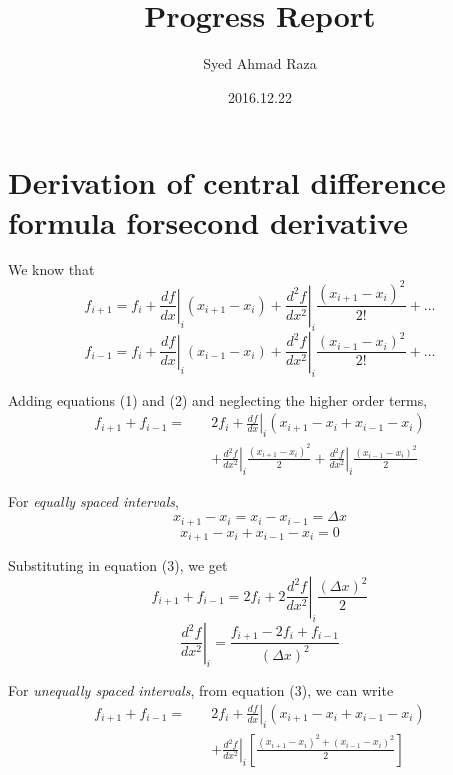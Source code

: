 \documentclass[12pt,a4paper,fleqn]{article}
\title{Progress Report}
\author{Syed Ahmad Raza}
\date{2016.12.22}
\begin{document}
\maketitle
\section*{Derivation of central difference formula for\newline second
derivative}

We know that
\begin{equation}
f_{i+1} = f_i + \left.\frac{df}{dx}\right|_i(x_{i+1} - x_i) +
\left.\frac{d^2f}{dx^2}\right|_i\frac{(x_{i+1} - x_i)^2}{2!} + \ldots
\end{equation}
\begin{equation}
f_{i-1} = f_i + \left.\frac{df}{dx}\right|_i(x_{i-1} - x_i) +
\left.\frac{d^2f}{dx^2}\right|_i\frac{(x_{i-1} - x_i)^2}{2!} + \ldots
\end{equation}

Adding equations (1) and (2) and neglecting the higher order terms,
\begin{equation}
\begin{split}
f_{i+1} + f_{i-1} = \quad &2f_i + \left.\frac{df}{dx}\right|_i(x_{i+1} - x_i +
x_{i-1} - x_i)
\\& + \left.\frac{d^2f}{dx^2}\right|_i\frac{(x_{i+1} - x_i)^2}{2} +
\left.\frac{d^2f}{dx^2}\right|_i\frac{(x_{i-1} - x_i)^2}{2}
\end{split}
\end{equation}

For \emph{equally spaced intervals},
\begin{equation*}
x_{i+1} - x_i = x_i - x_{i-1} = \Delta x
\end{equation*}
\begin{equation*}
x_{i+1} - x_i + x_{i-1} - x_i = 0 
\end{equation*}

Substituting in equation (3), we get
\begin{equation*}
f_{i+1} + f_{i-1} = 2f_i + 2\left.\frac{d^2f}{dx^2}\right|_i\frac{(\Delta
x)^2}{2}
\end{equation*}
\begin{equation}
\left.\frac{d^2f}{dx^2}\right|_i = \frac{f_{i+1} - 2f_i + f_{i-1}}{(\Delta
x)^2}
\end{equation}

For \emph{unequally spaced intervals}, from equation (3), we can write
\begin{equation}
\begin{split}
f_{i+1} + f_{i-1} = \quad &2f_i + \left.\frac{df}{dx}\right|_i(x_{i+1} - x_i +
x_{i-1} - x_i)
\\& + \left.\frac{d^2f}{dx^2}\right|_i\left[\frac{(x_{i+1} - x_i)^2 + (x_{i-1} -
x_i)^2}{2}\right]
\end{split}
\end{equation}
\end{document}

